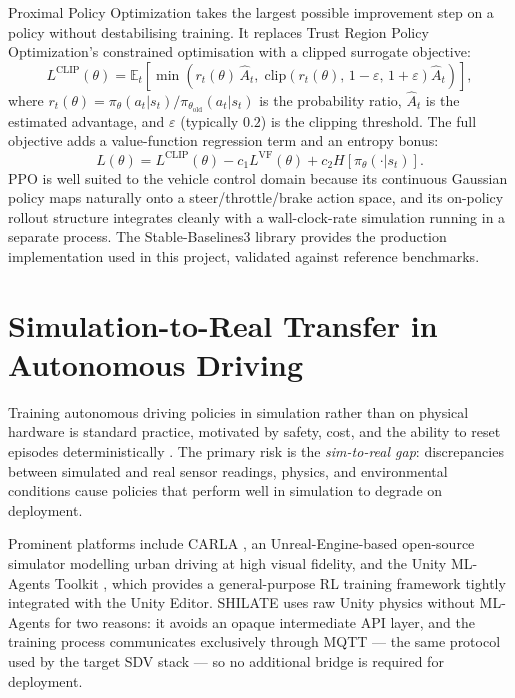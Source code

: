 Proximal Policy Optimization \cite{Schulman2017} takes the largest
possible improvement step on a policy without destabilising training. It
replaces Trust Region Policy Optimization's constrained optimisation with
a clipped surrogate objective:
\begin{equation}
  L^{\mathrm{CLIP}}(\theta) = \mathbb{E}_t \left[
    \min\!\left( r_t(\theta)\,\hat{A}_t,\;
      \mathrm{clip}\!\left(r_t(\theta),\,1{-}\varepsilon,\,1{+}\varepsilon\right)\hat{A}_t
    \right)
  \right],
  \label{eq:ppo-clip}
\end{equation}
where $r_t(\theta) = \pi_\theta(a_t|s_t) / \pi_{\theta_{\mathrm{old}}}(a_t|s_t)$
is the probability ratio, $\hat{A}_t$ is the estimated advantage, and
$\varepsilon$ (typically $0.2$) is the clipping threshold. The full
objective adds a value-function regression term and an entropy bonus:
\begin{equation}
  L(\theta) = L^{\mathrm{CLIP}}(\theta) - c_1 L^{\mathrm{VF}}(\theta)
             + c_2 H[\pi_\theta(\cdot|s_t)].
  \label{eq:ppo-full}
\end{equation}
PPO is well suited to the vehicle control domain because its continuous
Gaussian policy maps naturally onto a steer/throttle/brake action space,
and its on-policy rollout structure integrates cleanly with a
wall-clock-rate simulation running in a separate process. The
Stable-Baselines3 library \cite{Raffin2021} provides the production
implementation used in this project, validated against reference
benchmarks.

\section{Simulation-to-Real Transfer in Autonomous Driving}
\label{sec:sim2real}

Training autonomous driving policies in simulation rather than on physical
hardware is standard practice, motivated by safety, cost, and the ability
to reset episodes deterministically \cite{Kiran2021}. The primary risk is
the \textit{sim-to-real gap}: discrepancies between simulated and real
sensor readings, physics, and environmental conditions cause policies that
perform well in simulation to degrade on deployment.

Prominent platforms include CARLA \cite{Dosovitskiy2017}, an
Unreal-Engine-based open-source simulator modelling urban driving at high
visual fidelity, and the Unity ML-Agents Toolkit \cite{Juliani2020}, which
provides a general-purpose RL training framework tightly integrated with
the Unity Editor. SHILATE uses raw Unity physics without ML-Agents for
two reasons: it avoids an opaque intermediate API layer, and the training
process communicates exclusively through MQTT --- the same protocol used
by the target SDV stack --- so no additional bridge is required for
deployment.

